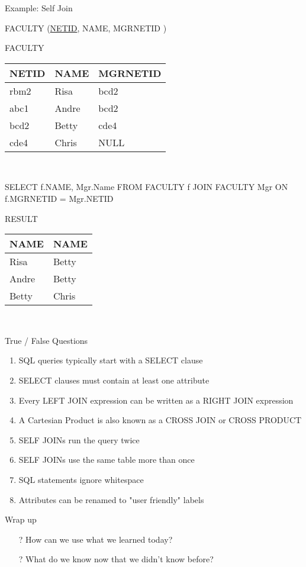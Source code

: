 \documentclass[aspectratio=169]{beamer}
\begin{document}
\begin{frame}[fragile]{Example: Self Join}

FACULTY (\underline{NETID}, NAME, MGRNETID )

FACULTY\\
\begin{tabular}{|l|l|l|} \hline
\textbf{NETID} & \textbf{NAME} & \textbf{MGRNETID} \\ \hline
rbm2 & Risa & bcd2 \\\hline
abc1 & Andre & bcd2 \\\hline
bcd2 & Betty & cde4  \\ \hline
cde4 & Chris & NULL\\ \hline
\end{tabular}\\


\begin{SQL}
SELECT f.NAME, Mgr.Name
FROM FACULTY f JOIN FACULTY Mgr ON f.MGRNETID = Mgr.NETID
\end{SQL}

RESULT\\
\begin{tabular}{|l|l|} \hline
\textbf{NAME} & \textbf{NAME}  \\ \hline
Risa & Betty \\\hline
Andre & Betty \\\hline
 Betty & Chris  \\ \hline
\end{tabular}\\

\end{frame}

\begin{frame}{True / False Questions}

\begin{enumerate}
\item SQL queries typically start with a SELECT clause %
\item SELECT clauses must contain at least one attribute %
\item Every LEFT JOIN expression can be written as a RIGHT JOIN expression %
\item A Cartesian Product is also known as a CROSS JOIN or CROSS PRODUCT %
\item SELF JOINs run the query twice %
\item SELF JOINs use the same table more than once %
\item SQL statements ignore whitespace %
\item Attributes can be renamed to "user friendly" labels %
\end{enumerate}
\end{frame}
	

\begin{frame}{Wrap up}
\begin{itemize}
	\item[?] How can we use what we learned today?
	\vspace{2em}
	\item[?] What do we know now that we didn't know before?
\end{itemize}


\end{frame}
\end{document}

